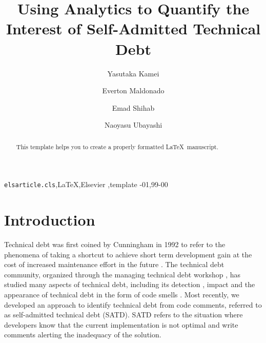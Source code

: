 \documentclass[review]{elsarticle}
\begin{document}
\begin{frontmatter}

\title{Using Analytics to Quantify the Interest of Self-Admitted Technical Debt}

\author[kyushu]{Yasutaka Kamei}

\author[concordia]{Everton Maldonado}

\author[concordia]{Emad Shihab}

\author[kyushu]{Naoyasu Ubayashi}

\address[kyushu]{Principles of Software Languages Group (POSL), Kyushu University, Fukuoka, Japan}
\address[concordia]{Data-driven Analysis of Software (DAS) Lab , Concordia University, Montre\'al, Canada}

\begin{abstract}
This template helps you to create a properly formatted \LaTeX\ manuscript.
\end{abstract}

\begin{keyword}
\texttt{elsarticle.cls}\sep \LaTeX\sep Elsevier \sep template
-01\sep  99-00
\end{keyword}

\end{frontmatter}

\linenumbers

\section{Introduction}
Technical debt was first coined by Cunningham in 1992 to refer to the phenomena of taking a shortcut to achieve short term development gain at the cost of increased maintenance effort in the future \cite{Cunningham1992WPM}. The technical debt community, organized through the managing technical debt workshop \cite{MTD2016}, has studied many aspects of technical debt, including its detection \cite{Zazworka2013EASE}, impact \cite{Zazworka2011MTD} and the appearance of technical debt in the form of code smells \cite{Fontana2012MTD}. Most recently, we developed an approach to identify technical debt from code comments, referred to as self-admitted technical debt (SATD). SATD refers to the situation where developers know that the current implementation is not optimal and write comments alerting the inadequacy of the solution. 
\end{document}
